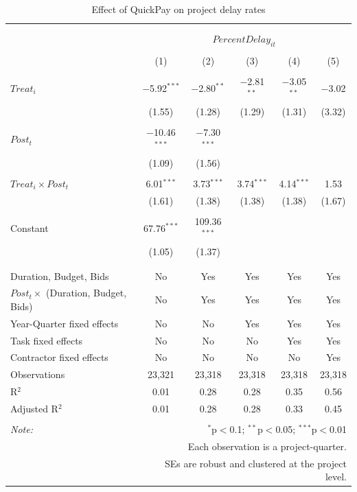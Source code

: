\documentclass[
]{article}
\begin{document}
\begin{table}[H] \centering 
  \caption{Effect of QuickPay on project delay rates} 
  \label{} 
\small 
\begin{tabular}{@{\extracolsep{-2pt}}lccccc} 
\\[-1.8ex]\hline 
\hline \\[-1.8ex] 
\\[-1.8ex] & \multicolumn{5}{c}{$PercentDelay_{it}$} \\ 
\\[-1.8ex] & (1) & (2) & (3) & (4) & (5)\\ 
\hline \\[-1.8ex] 
 $Treat_i$ & $-$5.92$^{***}$ & $-$2.80$^{**}$ & $-$2.81$^{**}$ & $-$3.05$^{**}$ & $-$3.02 \\ 
  & (1.55) & (1.28) & (1.29) & (1.31) & (3.32) \\ 
  & & & & & \\ 
 $Post_t$ & $-$10.46$^{***}$ & $-$7.30$^{***}$ &  &  &  \\ 
  & (1.09) & (1.56) &  &  &  \\ 
  & & & & & \\ 
 $Treat_i \times Post_t$ & 6.01$^{***}$ & 3.73$^{***}$ & 3.74$^{***}$ & 4.14$^{***}$ & 1.53 \\ 
  & (1.61) & (1.38) & (1.38) & (1.38) & (1.67) \\ 
  & & & & & \\ 
 Constant & 67.76$^{***}$ & 109.36$^{***}$ &  &  &  \\ 
  & (1.05) & (1.37) &  &  &  \\ 
  & & & & & \\ 
\hline \\[-1.8ex] 
Duration, Budget, Bids & No & Yes & Yes & Yes & Yes \\ 
$Post_t \times$  (Duration, Budget, Bids) & No & Yes & Yes & Yes & Yes \\ 
Year-Quarter fixed effects & No & No & Yes & Yes & Yes \\ 
Task fixed effects & No & No & No & Yes & Yes \\ 
Contractor fixed effects & No & No & No & No & Yes \\ 
Observations & 23,321 & 23,318 & 23,318 & 23,318 & 23,318 \\ 
R$^{2}$ & 0.01 & 0.28 & 0.28 & 0.35 & 0.56 \\ 
Adjusted R$^{2}$ & 0.01 & 0.28 & 0.28 & 0.33 & 0.45 \\ 
\hline 
\hline \\[-1.8ex] 
\textit{Note:}  & \multicolumn{5}{r}{$^{*}$p$<$0.1; $^{**}$p$<$0.05; $^{***}$p$<$0.01} \\ 
 & \multicolumn{5}{r}{Each observation is a project-quarter.} \\ 
 & \multicolumn{5}{r}{SEs are robust and clustered at the project level.} \\ 
\end{tabular} 
\end{table}
\end{document}

